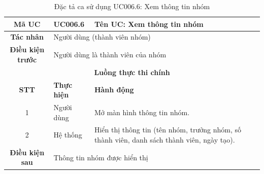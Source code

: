 \begin{table}[H]
    \centering
    \label{tab:uc006-6}
    \begin{tabularx}{\textwidth}{|c|p{3.5cm}|X|}
        \hline
        \rowcolor{headergreen} 
        \textbf{Mã UC} & \textbf{UC006.6} & \textbf{Tên UC: Xem thông tin nhóm} \\ \hline
        \textbf{Tác nhân} & \multicolumn{2}{l|}{Người dùng (thành viên nhóm)} \\ \hline
        \textbf{Điều kiện trước} & \multicolumn{2}{X|}{Người dùng là thành viên của nhóm} \\ \hline
        
        \multicolumn{3}{|c|}{\cellcolor{headerorange}\textbf{Luồng thực thi chính}} \\ \hline
        \rowcolor{graybg} \textbf{STT} & \textbf{Thực hiện} & \textbf{Hành động} \\ \hline
        1 & Người dùng & Mở màn hình thông tin nhóm. \\ \hline
        2 & Hệ thống & Hiển thị thông tin (tên nhóm, trưởng nhóm, số thành viên, danh sách thành viên, ngày tạo). \\ \hline
        
        \textbf{Điều kiện sau} & \multicolumn{2}{X|}{Thông tin nhóm được hiển thị} \\ \hline
    \end{tabularx}
    \caption{Đặc tả ca sử dụng UC006.6: Xem thông tin nhóm}
\end{table}

